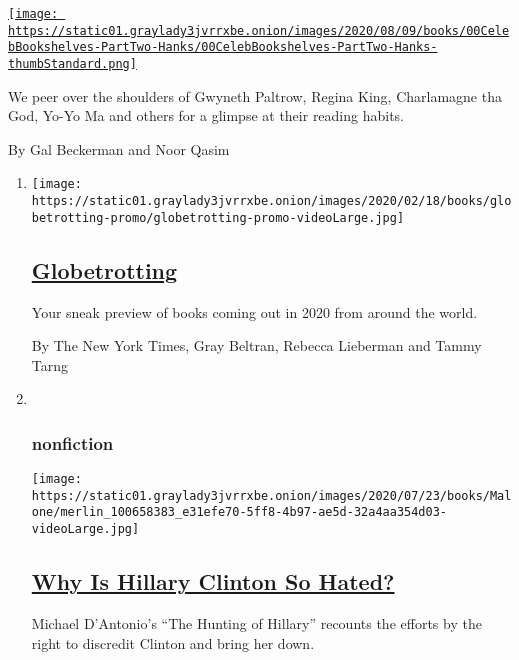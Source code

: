 \begin{enumerate}
\begin{enumerate}
    \href{/2020/07/27/books/tom-hanks-gwyneth-paltrow-bookshelves.html}{\texttt{[image: https://static01.graylady3jvrrxbe.onion/images/2020/08/09/books/00CelebBookshelves-PartTwo-Hanks/00CelebBookshelves-PartTwo-Hanks-thumbStandard.png]}}

    We peer over the shoulders of Gwyneth Paltrow, Regina King,
    Charlamagne tha God, Yo-Yo Ma and others for a glimpse at their
    reading habits.

    By Gal Beckerman and Noor Qasim
  \end{enumerate}
\end{enumerate}

\begin{enumerate}
\def\labelenumi{\arabic{enumi}.}
\item
  \texttt{[image: https://static01.graylady3jvrrxbe.onion/images/2020/02/18/books/globetrotting-promo/globetrotting-promo-videoLarge.jpg]}

  \hypertarget{globetrotting}{%
  \subsection{\texorpdfstring{\href{/interactive/2020/01/08/books/new-books-international.html}{Globetrotting}}{Globetrotting}}\label{globetrotting}}

  Your sneak preview of books coming out in 2020 from around the world.

  By The New York Times, Gray Beltran, Rebecca Lieberman and Tammy Tarng
\item ~
  \hypertarget{nonfiction}{%
  \subsubsection{nonfiction}\label{nonfiction}}

  \texttt{[image: https://static01.graylady3jvrrxbe.onion/images/2020/07/23/books/Malone/merlin\_100658383\_e31efe70-5ff8-4b97-ae5d-32a4aa354d03-videoLarge.jpg]}

  \hypertarget{why-is-hillary-clinton-so-hated}{%
  \subsection{\texorpdfstring{\href{/2020/07/28/books/review/the-hunting-of-hillary-michael-dantonio.html}{Why
  Is Hillary Clinton So
  Hated?}}{Why Is Hillary Clinton So Hated?}}\label{why-is-hillary-clinton-so-hated}}

  Michael D'Antonio's ``The Hunting of Hillary'' recounts the efforts by
  the right to discredit Clinton and bring her down.


\end{enumerate}
